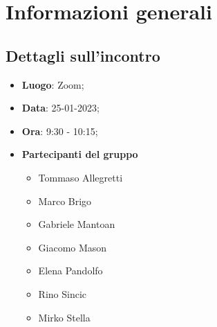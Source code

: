 \section{Informazioni generali}

\subsection{Dettagli sull'incontro}
\begin{itemize}
    \item \textbf{Luogo}: Zoom;
    \item \textbf{Data}: 25-01-2023;
    \item \textbf{Ora}: 9:30 - 10:15;
    \item \textbf{Partecipanti del gruppo}
        \begin{itemize}
            \item Tommaso Allegretti
            \item Marco Brigo
            \item Gabriele Mantoan
            \item Giacomo Mason
            \item Elena Pandolfo
            \item Rino Sincic
            \item Mirko Stella
        \end{itemize}
\end{itemize}

